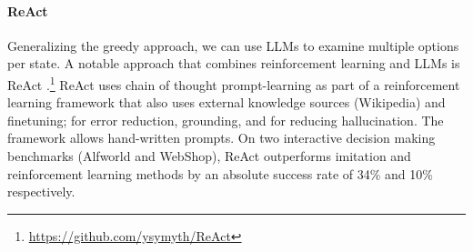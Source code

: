 \paragraph{ReAct}
Generalizing the greedy approach, we can use LLMs to examine multiple options per state.  
A notable approach that combines reinforcement learning and LLMs is ReAct \citep{yao2022react}.\footnote{\url{https://github.com/ysymyth/ReAct}}
ReAct uses chain of thought prompt-learning as part of a reinforcement learning framework that also uses external knowledge sources (Wikipedia) and finetuning; for error reduction, grounding, and for reducing hallucination. The framework allows hand-written prompts.
%
%
On two interactive decision
making benchmarks (Alfworld and WebShop),
ReAct outperforms imitation
and reinforcement learning methods by an absolute success rate of 34\%
and 10\% respectively.

